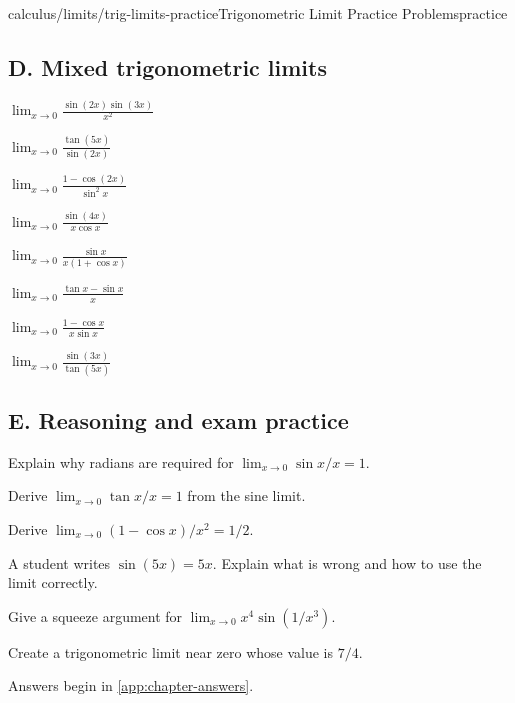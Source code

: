 \begin{webpage}{calculus/limits/trig-limits-practice}{Trigonometric Limit Practice Problems}{practice}
\subsection*{D. Mixed trigonometric limits}
\begin{bgexercises}[label=\textbf{3.\arabic*},resume]
  \item \(\displaystyle\lim_{x\to0}\frac{\sin(2x)\sin(3x)}{x^2}\)
  \item \(\displaystyle\lim_{x\to0}\frac{\tan(5x)}{\sin(2x)}\)
  \item \(\displaystyle\lim_{x\to0}\frac{1-\cos(2x)}{\sin^2x}\)
  \item \(\displaystyle\lim_{x\to0}\frac{\sin(4x)}{x\cos x}\)
  \item \(\displaystyle\lim_{x\to0}\frac{\sin x}{x(1+\cos x)}\)
  \item \(\displaystyle\lim_{x\to0}\frac{\tan x-\sin x}{x}\)
  \item \(\displaystyle\lim_{x\to0}\frac{1-\cos x}{x\sin x}\)
  \item \(\displaystyle\lim_{x\to0}\frac{\sin(3x)}{\tan(5x)}\)
\end{bgexercises}

\subsection*{E. Reasoning and exam practice}
\begin{bgexercises}[label=\textbf{3.\arabic*},resume]
  \item Explain why radians are required for \(\lim_{x\to0}\sin x/x=1\).
  \item Derive \(\lim_{x\to0}\tan x/x=1\) from the sine limit.
  \item Derive \(\lim_{x\to0}(1-\cos x)/x^2=1/2\).
  \item A student writes \(\sin(5x)=5x\). Explain what is wrong and how to use the limit correctly.
  \item Give a squeeze argument for \(\lim_{x\to0}x^4\sin(1/x^3)\).
  \item Create a trigonometric limit near zero whose value is \(7/4\).
\end{bgexercises}

Answers begin in \cref{app:chapter-answers}.
\end{webpage}
